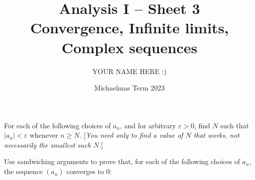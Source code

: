 \documentclass[answers]{exam}
\title{Analysis I -- Sheet 3\\Convergence, Infinite limits, Complex sequences}
\author{YOUR NAME HERE :)}
\date{Michaelmas Term 2023}
\begin{document}
\maketitle
\begin{questions}

\question%
For each of the following choices of $a_{n}$, and for arbitrary $\varepsilon>0$, find $N$ such that $\left|a_{n}\right|<\varepsilon$ whenever $n \geqslant N$. [\emph{You need only to find a value of $N$ that works, not necessarily the smallest such $N$.}]



\question%
Use sandwiching arguments to prove that, for each of the following choices of $a_{n}$, the sequence $\left(a_{n}\right)$ converges to 0:




\end{questions}
\end{document}

